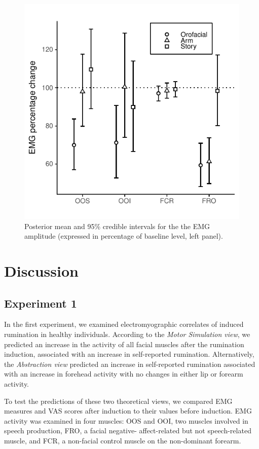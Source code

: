 \documentclass[a4paper,12pt,twoside,openright,oldfontcommands,final]{memoir}
\begin{document}
\begin{figure}[H]

{\centering \includegraphics[width=0.75\linewidth]{assets/emg_fig3} 

}

\caption{Posterior mean and 95\% credible intervals for the the EMG amplitude (expressed in percentage of baseline level, left panel).}\label{fig:resultsemgfig3}
\end{figure}

\hypertarget{discussion}{%
\section{Discussion}\label{discussion}}

\hypertarget{experiment-1}{%
\subsection{Experiment 1}\label{experiment-1}}

In the first experiment, we examined electromyographic correlates of induced rumination in healthy individuals. According to the \emph{Motor Simulation view}, we predicted an increase in the activity of all facial muscles after the rumination induction, associated with an increase in self-reported rumination. Alternatively, the \emph{Abstraction view} predicted an increase in self-reported rumination associated with an increase in forehead activity with no changes in either lip or forearm activity.

To test the predictions of these two theoretical views, we compared EMG measures and VAS scores after induction to their values before induction. EMG activity was examined in four muscles: OOS and OOI, two muscles involved in speech production, FRO, a facial negative- affect-related but not speech-related muscle, and FCR, a non-facial control muscle on the non-dominant forearm.
\end{document}
